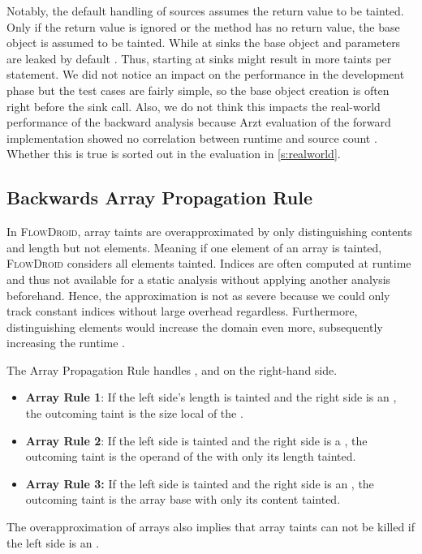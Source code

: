 \documentclass[../draft.tex]{subfiles}
\begin{document}
    Notably, the default handling of sources assumes the return value to be tainted.
    Only if the return value is ignored or the method has no return value, the base object is assumed to be tainted.
    While at sinks the base object and parameters are leaked by default \cite{Arzt2017PhD}.
    Thus, starting at sinks might result in more taints per statement.
    We did not notice an impact on the performance in the development phase but the test cases are fairly simple, so the base object creation is often right before the sink call.
    Also, we do not think this impacts the real-world performance of the backward analysis because Arzt evaluation of the forward implementation showed no correlation between runtime and source count \cite{Arzt2017PhD}.
    Whether this is true is sorted out in the evaluation in \autoref{s:realworld}.

    \subsection{Backwards Array Propagation Rule}
    In \textsc{FlowDroid}, array taints are overapproximated by only distinguishing contents and length but not elements. Meaning if one element of an array is tainted, \textsc{FlowDroid} considers all elements tainted.
    Indices are often computed at runtime and thus not available for a static analysis without applying another analysis beforehand. Hence, the approximation is not as severe because we could only track constant indices without large overhead regardless.
    Furthermore, distinguishing elements would increase the domain even more, subsequently increasing the runtime \cite{Arzt2017PhD}.

    The Array Propagation Rule handles ,  and  on the right-hand side.
    \begin{itemize}
        \item \textbf{Array Rule 1}: If the left side's length is tainted and the right side is an , the outcoming taint is the size local of the .
        \item  \textbf{Array Rule 2}: If the left side is tainted and the right side is a , the outcoming taint is the operand of the  with only its length tainted.
        \item \textbf{Array Rule 3:} If the left side is tainted and the right side is an , the outcoming taint is the array base with only its content tainted.
    \end{itemize}
    The overapproximation of arrays also implies that array taints can not be killed if the left side is an .
\end{document}
